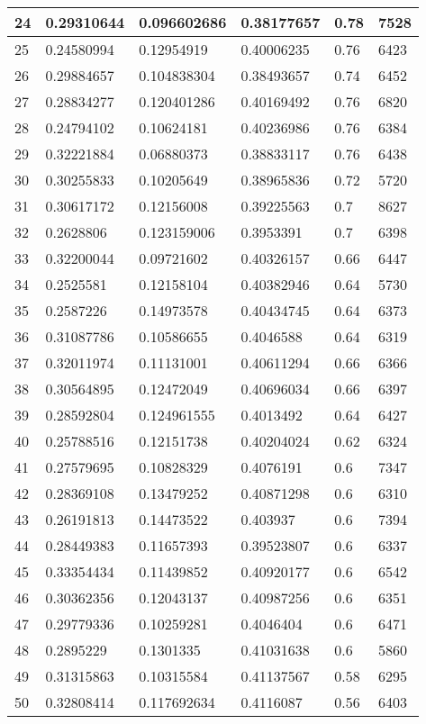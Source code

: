 \begin{longtable}{|l|l|l|l|l|l|}
24 & 0.29310644 & 0.096602686 & 0.38177657 & 0.78 & 7528 \\ \hline 
25 & 0.24580994 & 0.12954919 & 0.40006235 & 0.76 & 6423 \\ \hline 
26 & 0.29884657 & 0.104838304 & 0.38493657 & 0.74 & 6452 \\ \hline 
27 & 0.28834277 & 0.120401286 & 0.40169492 & 0.76 & 6820 \\ \hline 
28 & 0.24794102 & 0.10624181 & 0.40236986 & 0.76 & 6384 \\ \hline 
29 & 0.32221884 & 0.06880373 & 0.38833117 & 0.76 & 6438 \\ \hline 
30 & 0.30255833 & 0.10205649 & 0.38965836 & 0.72 & 5720 \\ \hline 
31 & 0.30617172 & 0.12156008 & 0.39225563 & 0.7 & 8627 \\ \hline 
32 & 0.2628806 & 0.123159006 & 0.3953391 & 0.7 & 6398 \\ \hline 
33 & 0.32200044 & 0.09721602 & 0.40326157 & 0.66 & 6447 \\ \hline 
34 & 0.2525581 & 0.12158104 & 0.40382946 & 0.64 & 5730 \\ \hline 
35 & 0.2587226 & 0.14973578 & 0.40434745 & 0.64 & 6373 \\ \hline 
36 & 0.31087786 & 0.10586655 & 0.4046588 & 0.64 & 6319 \\ \hline 
37 & 0.32011974 & 0.11131001 & 0.40611294 & 0.66 & 6366 \\ \hline 
38 & 0.30564895 & 0.12472049 & 0.40696034 & 0.66 & 6397 \\ \hline 
39 & 0.28592804 & 0.124961555 & 0.4013492 & 0.64 & 6427 \\ \hline 
40 & 0.25788516 & 0.12151738 & 0.40204024 & 0.62 & 6324 \\ \hline 
41 & 0.27579695 & 0.10828329 & 0.4076191 & 0.6 & 7347 \\ \hline 
42 & 0.28369108 & 0.13479252 & 0.40871298 & 0.6 & 6310 \\ \hline 
43 & 0.26191813 & 0.14473522 & 0.403937 & 0.6 & 7394 \\ \hline 
44 & 0.28449383 & 0.11657393 & 0.39523807 & 0.6 & 6337 \\ \hline 
45 & 0.33354434 & 0.11439852 & 0.40920177 & 0.6 & 6542 \\ \hline 
46 & 0.30362356 & 0.12043137 & 0.40987256 & 0.6 & 6351 \\ \hline 
47 & 0.29779336 & 0.10259281 & 0.4046404 & 0.6 & 6471 \\ \hline 
48 & 0.2895229 & 0.1301335 & 0.41031638 & 0.6 & 5860 \\ \hline 
49 & 0.31315863 & 0.10315584 & 0.41137567 & 0.58 & 6295 \\ \hline 
50 & 0.32808414 & 0.117692634 & 0.4116087 & 0.56 & 6403 \\ \hline 
\end{longtable}